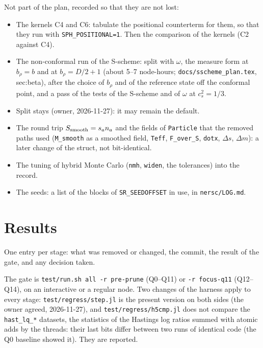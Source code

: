 \documentclass[11pt,aps,preprint,nofootinbib,superscriptaddress,tightenlines]{revtex4-2}
\begin{document}
Not part of the plan, recorded so that they are not lost:
\begin{itemize}
\item The kernels C4 and C6: tabulate the positional counterterm for them, so that they run with \texttt{SPH\_POSITIONAL=1}.  Then the comparison of the kernels (C2 against C4).
\item The non-conformal run of the S-scheme: split with $\omega$, the measure form at $b_\rho=b$ and at $b_\rho=D/2+1$ (about 5--7 node-hours;
  \nolinkurl{docs/sscheme_plan.tex}, sec:beta), after the choice of $b_\rho$ and of the reference state off the conformal point, and a pass of
  the tests of the S-scheme and of $\omega$ at $c_s^2=1/3$.
\item Split stays (owner, 2026-11-27): it may remain the default.
\item The round trip $S_{\rm smooth}=s_a n_a$ and the fields of \texttt{Particle} that the removed paths used (\texttt{M\_smooth} as a smoothed
  field, \texttt{Teff}, \texttt{F\_over\_S}, \texttt{dotx}, $\Delta s$, $\Delta m$): a later change of the struct, not bit-identical.
\item The tuning of hybrid Monte Carlo (\texttt{nmh}, \texttt{widen}, the tolerances) into the record.
\item The seeds: a list of the blocks of \texttt{SR\_SEEDOFFSET} in use, in \nolinkurl{nersc/LOG.md}.
\end{itemize}

\section{Results}
\label{sec:results}

One entry per stage: what was removed or changed, the commit, the result of the gate, and any decision taken.

The gate is \texttt{test/run.sh all -r pre-prune} (Q0--Q11) or \texttt{-r focus-q11} (Q12--Q14), on an interactive or a regular node.
Two changes of the harness apply to every stage: \nolinkurl{test/regress/step.jl} is the present version on both sides (the owner agreed,
2026-11-27), and \nolinkurl{test/regress/h5cmp.jl} does not compare the \texttt{hast\_lq\_*} datasets, the statistics of the Hastings
log ratios summed with atomic adds by the threads: their last bits differ between two runs of identical code (the Q0 baseline showed it).
They are reported.
\end{document}
